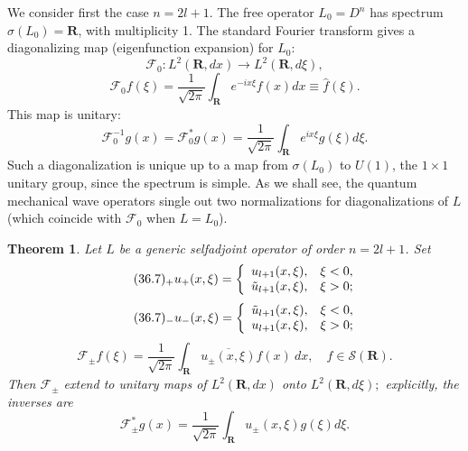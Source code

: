 \documentclass{surv-l}
\theoremstyle{plain}
\newtheorem{theorem}{Theorem}[section]
\theoremstyle{definition}
\numberwithin{equation}{chapter}
\begin{document}
We consider first the case $n=2l+1$. The free operator $L_{0}=D^{n}$ has spectrum $\sigma(L_{0})=\mathbf{R}$, with multiplicity 1. The standard Fourier transform gives a diagonalizing map (eigenfunction expansion) for $L_{0}$:
\begin{equation}\label{eq36.4}
\mathscr{F}_{0}:L^{2}(\mathbf{R}, dx)\rightarrow L^{2}(\mathbf{R}, d\xi),
\end{equation}
\begin{equation*}
\mathscr{F}_{0}f(\xi)=\frac{1}{\sqrt{2\pi}}\int_{\mathbf{R}}e^{-ix\xi}f(x)dx\equiv\hat{f}(\xi).
\end{equation*}
This map is unitary:
\begin{equation}\label{eq36.5}
\mathscr{F}_{0}^{-1}g(x)=\mathscr{F}_{0}^{*}g(x)=\frac{1}{\sqrt{2\pi}}\int_{\mathbf{R}}e^{ix\xi}g(\xi)d\xi.
\end{equation}
Such a diagonalization is unique up to a map from $\sigma(L_{0})$ to $U(1)$, the $1\times 1$ unitary group, since the spectrum is simple. As we shall see, the quantum mechanical wave operators single out two normalizations for diagonalizations of $L$ (which coincide with $\mathscr{F}_{0}$ when $L=L_{0}$).
\renewcommand\thetheorem{36.\arabic{theorem}}
\setcounter{theorem}{5}
\begin{theorem}\label{thm36.6}
Let $L$ be a generic selfadjoint operator of order $n=2l +1$.
Set
\begin{equation*}
\tag*{$(36.7)_{+}$} u_{+}(x, \xi)=\left\{\begin{array}{ll}
u_{l+1}(x,\xi), & \xi <0,\\
\tilde{u}_{l+1}(x, \xi), & \xi>0;
\end{array}\right.
\end{equation*}
\begin{equation*}
\tag*{$(36.7)_{-}$} u_{-}(x, \xi)=\left\{\begin{array}{ll}
\tilde{u}_{l+1}(x, \xi), & \xi<0,\\
u_{l+1}(x, \xi), & \xi >0;
\end{array}\right.
\end{equation*}
\setcounter{equation}{7}
\begin{equation}\label{eq36.8}
\mathscr{F}_{\pm}f(\xi)=\frac{1}{\sqrt{2\pi}}\int_{\mathbf{R}}\overline{u_{\pm}(x, \xi)}f(x)\ dx,\quad f\in \mathscr{S}(\mathbf{R}).
\end{equation}
Then $\mathscr{F}_{\pm}$ extend to unitary maps of $L^{2}(\mathbf{R}, dx)$ onto $L^{2}(\mathbf{R}, d\xi);$ explicitly, the inverses are
\begin{equation}\label{eq36.9}
\mathscr{F}_{\pm}^{*}g(x)=\frac{1}{\sqrt{2\pi}}\int_{\mathbf{R}}u_{\pm}(x, \xi)g(\xi)d\xi.
\end{equation}
\end{theorem}
\end{document}
